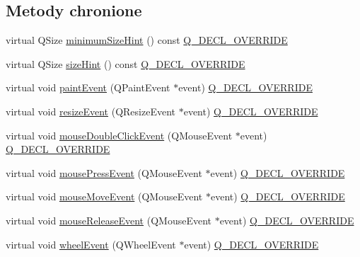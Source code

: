 \subsection*{Metody chronione}
\begin{DoxyCompactItemize}
\item 
virtual Q\+Size \hyperlink{class_q_custom_plot_a968a01cd4077d63aecde1aef1db057fc}{minimum\+Size\+Hint} () const \hyperlink{qcustomplot_8hh_a42cc5eaeb25b85f8b52d2a4b94c56f55}{Q\+\_\+\+D\+E\+C\+L\+\_\+\+O\+V\+E\+R\+R\+I\+DE}
\item 
virtual Q\+Size \hyperlink{class_q_custom_plot_ac9d6fe101e082daf756903b11f6e6213}{size\+Hint} () const \hyperlink{qcustomplot_8hh_a42cc5eaeb25b85f8b52d2a4b94c56f55}{Q\+\_\+\+D\+E\+C\+L\+\_\+\+O\+V\+E\+R\+R\+I\+DE}
\item 
virtual void \hyperlink{class_q_custom_plot_a8068b368e5813065ee0f4cf7c6d21330}{paint\+Event} (Q\+Paint\+Event $\ast$event) \hyperlink{qcustomplot_8hh_a42cc5eaeb25b85f8b52d2a4b94c56f55}{Q\+\_\+\+D\+E\+C\+L\+\_\+\+O\+V\+E\+R\+R\+I\+DE}
\item 
virtual void \hyperlink{class_q_custom_plot_af5b69dc6a431562ecdd1d0718bcbdf70}{resize\+Event} (Q\+Resize\+Event $\ast$event) \hyperlink{qcustomplot_8hh_a42cc5eaeb25b85f8b52d2a4b94c56f55}{Q\+\_\+\+D\+E\+C\+L\+\_\+\+O\+V\+E\+R\+R\+I\+DE}
\item 
virtual void \hyperlink{class_q_custom_plot_a344075e6e80ed6d575c79b81694abb8a}{mouse\+Double\+Click\+Event} (Q\+Mouse\+Event $\ast$event) \hyperlink{qcustomplot_8hh_a42cc5eaeb25b85f8b52d2a4b94c56f55}{Q\+\_\+\+D\+E\+C\+L\+\_\+\+O\+V\+E\+R\+R\+I\+DE}
\item 
virtual void \hyperlink{class_q_custom_plot_aac0a7296a6031dc667c01c1abd4ecc6b}{mouse\+Press\+Event} (Q\+Mouse\+Event $\ast$event) \hyperlink{qcustomplot_8hh_a42cc5eaeb25b85f8b52d2a4b94c56f55}{Q\+\_\+\+D\+E\+C\+L\+\_\+\+O\+V\+E\+R\+R\+I\+DE}
\item 
virtual void \hyperlink{class_q_custom_plot_ae7abdc93b26d2ad4632c1ab75ae5b46f}{mouse\+Move\+Event} (Q\+Mouse\+Event $\ast$event) \hyperlink{qcustomplot_8hh_a42cc5eaeb25b85f8b52d2a4b94c56f55}{Q\+\_\+\+D\+E\+C\+L\+\_\+\+O\+V\+E\+R\+R\+I\+DE}
\item 
virtual void \hyperlink{class_q_custom_plot_adc24846f52199e5a9bc35c387a6ce68d}{mouse\+Release\+Event} (Q\+Mouse\+Event $\ast$event) \hyperlink{qcustomplot_8hh_a42cc5eaeb25b85f8b52d2a4b94c56f55}{Q\+\_\+\+D\+E\+C\+L\+\_\+\+O\+V\+E\+R\+R\+I\+DE}
\item 
virtual void \hyperlink{class_q_custom_plot_a7848c9ac8be60bbd8fcea9b53be543c5}{wheel\+Event} (Q\+Wheel\+Event $\ast$event) \hyperlink{qcustomplot_8hh_a42cc5eaeb25b85f8b52d2a4b94c56f55}{Q\+\_\+\+D\+E\+C\+L\+\_\+\+O\+V\+E\+R\+R\+I\+DE}

\end{DoxyCompactItemize}
